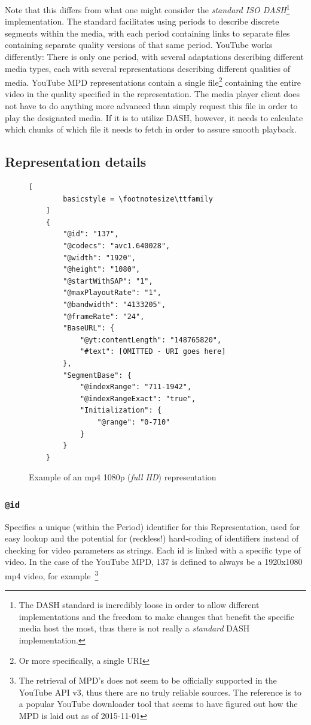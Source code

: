 Note that this differs from what one might consider the \textit{standard ISO
DASH}\footnote{The DASH standard is incredibly loose in order to allow different
implementations and the freedom to make changes that benefit the specific media
host the most, thus there is not really a \textit{standard} DASH implementation.}
implementation. The standard facilitates using periods to
describe discrete segments within the media, with each period containing links
to separate files containing separate quality versions of that same period.
YouTube works differently: There is only one period, with several adaptations
describing different media types, each with several representations describing
different qualities of media. YouTube MPD representations contain a single file\footnote{Or more specifically, a single URI}
containing the entire video in the quality specified in the representation.
The media player client does not have to do anything more advanced than simply
request this file in order to play the designated media. If it is to utilize
DASH, however, it needs to calculate which chunks of which file it needs to
fetch in order to assure smooth playback.

\subsection{Representation details}

\begin{figure}
    \centering
    \begin{lstlisting}[
        basicstyle = \footnotesize\ttfamily
    ]
    {
        "@id": "137",
        "@codecs": "avc1.640028",
        "@width": "1920",
        "@height": "1080",
        "@startWithSAP": "1",
        "@maxPlayoutRate": "1",
        "@bandwidth": "4133205",
        "@frameRate": "24",
        "BaseURL": {
            "@yt:contentLength": "148765820",
            "#text": [OMITTED - URI goes here]
        },
        "SegmentBase": {
            "@indexRange": "711-1942",
            "@indexRangeExact": "true",
            "Initialization": {
                "@range": "0-710"
            }
        }
    }
    \end{lstlisting}
    \caption{Example of an mp4 1080p (\textit{full HD}) representation}
    \label{fig:dash-1080p-representation}
\end{figure}

\subsubsection{\texttt{@id}}
Specifies a unique (within the Period) identifier for this Representation, used
for easy lookup and the
potential for (reckless!) hard-coding of identifiers instead of checking for
video parameters as strings.
Each id is linked with a specific type of video. In the case of the
YouTube MPD, $137$ is defined to always be a 1920x1080 mp4 video, for
example~\cite[line 303]{youtube-dl:youtube.py}\footnote{The retrieval of MPD's
does not seem to be officially supported in the YouTube API v3, thus there are
no truly reliable sources. The reference is to a popular YouTube downloader tool
that seems to have figured out how the MPD is laid out as of 2015-11-01}

